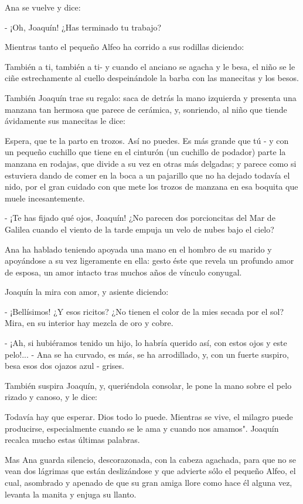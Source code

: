 \documentclass[12pt, twoside, openright]{book} %
\begin{document}
Ana se vuelve y dice:

- ¡Oh, Joaquín! ¿Has terminado tu trabajo? 

 Mientras tanto el pequeño Alfeo ha corrido a sus rodillas diciendo: 

También a ti, también a ti- y cuando el anciano se agacha y le besa, el niño se le ciñe estrechamente al cuello despeinándole la barba con las manecitas y los besos. 

También Joaquín trae su regalo: saca de detrás la mano izquierda y presenta una manzana tan hermosa que parece de cerámica, y, sonriendo, al niño que tiende ávidamente sus manecitas le dice: 

Espera, que te la parto en trozos. Así no puedes. Es más grande que tú - y con un pequeño cuchillo que tiene en el cinturón (un cuchillo de podador) parte la manzana en rodajas, que divide a su vez en otras más delgadas; y parece como si estuviera dando de comer en la boca a un pajarillo que no ha dejado todavía el nido, por el gran cuidado con que mete los trozos de manzana en esa boquita que muele incesantemente. 

- ¡Te has fijado qué ojos, Joaquín! ¿No parecen dos porcioncitas del Mar de Galilea cuando el viento de la tarde empuja un velo de nubes bajo el cielo? 

Ana ha hablado teniendo apoyada una mano en el hombro de su marido y apoyándose a su vez ligeramente en ella: gesto éste que revela un profundo amor de esposa, un amor intacto tras muchos años de vínculo conyugal. 

Joaquín la mira con amor, y asiente diciendo: 

- ¡Bellísimos! ¿Y esos ricitos? ¿No tienen el color de la mies secada por el sol? Mira, en su interior hay mezcla de oro y cobre. 

- ¡Ah, si hubiéramos tenido un hijo, lo habría querido así, con estos ojos y este pelo!... - Ana se ha curvado, es más, se ha arrodillado, y, con un fuerte suspiro, besa esos dos ojazos azul - grises. 

También suspira Joaquín, y, queriéndola consolar, le pone la mano sobre el pelo rizado y canoso, y le dice: 

Todavía hay que esperar. Dios todo lo puede. Mientras se vive, el milagro puede producirse, especialmente cuando se le ama y cuando nos amamos". Joaquín recalca mucho estas últimas palabras. 

Mas Ana guarda silencio, descorazonada, con la cabeza agachada, para que no se vean dos lágrimas que están deslizándose y que advierte sólo el pequeño Alfeo, el cual, asombrado y apenado de que su gran amiga llore como hace él alguna vez, levanta la manita y enjuga su llanto. 
\end{document}
